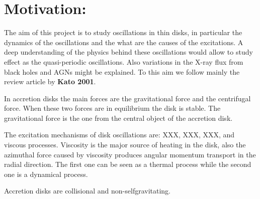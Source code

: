 \section*{Motivation:}

The aim of this project is to study oscillations in thin disks, in
particular the dynamics of the oscillations and the what are the
causes of the excitations. A deep understanding of the physics behind
these oscillations would allow to study effect as the quasi-periodic
oscillations. Also variations in the X-ray flux from black holes and
AGNs might be explained. To this aim we follow mainly the review
article by \textbf{Kato 2001}.

In accretion disks the main forces are the gravitational force and the
centrifugal force. When these two forces are in equilibrium the disk
is stable. The gravitational force is the one from the central object
of the accretion disk.

The excitation mechanisms of disk oscillations are: XXX, XXX, XXX, and viscous
processes. Viscosity is the major source of heating in the disk, also
the azimuthal force caused by viscosity produces angular momentum
transport in the radial direction. The first one can be seen as a
thermal process while the second one is a dynamical process.

Accretion disks are collisional and non-selfgravitating.

